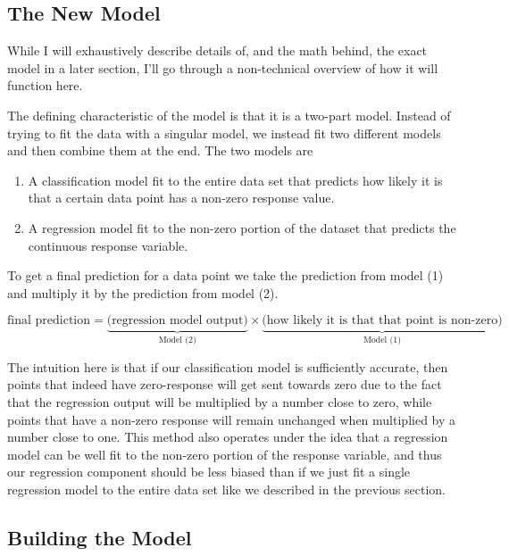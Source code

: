 \documentclass[12pt,twoside]{reedthesis}
\begin{document}
\hypertarget{the-new-model}{%
\subsection{The New Model}\label{the-new-model}}

While I will exhaustively describe details of, and the math behind, the exact model in a later section, I'll go through a non-technical overview of how it will function here.

The defining characteristic of the model is that it is a two-part model. Instead of trying to fit the data with a singular model, we instead fit two different models and then combine them at the end. The two models are
\begin{enumerate}
\def\labelenumi{\arabic{enumi}.}
\item
  A classification model fit to the entire data set that predicts how likely it is that a certain data point has a non-zero response value.
\item
  A regression model fit to the non-zero portion of the dataset that predicts the continuous response variable.
\end{enumerate}
To get a final prediction for a data point we take the prediction from model (1) and multiply it by the prediction from model (2).

\[
\text{final prediction} = \underbrace{\bigg(\text{regression model output}\bigg)}_{\text{Model (2)}} \times \underbrace{\bigg(\text{how likely it is that that point is non-zero}\bigg)}_{\text{Model (1)}}
\]

The intuition here is that if our classification model is sufficiently accurate, then points that indeed have zero-response will get sent towards zero due to the fact that the regression output will be multiplied by a number close to zero, while points that have a non-zero response will remain unchanged when multiplied by a number close to one. This method also operates under the idea that a regression model can be well fit to the non-zero portion of the response variable, and thus our regression component should be less biased than if we just fit a single regression model to the entire data set like we described in the previous section.

\hypertarget{building-the-model}{%
\subsection{Building the Model}\label{building-the-model}}
\end{document}
